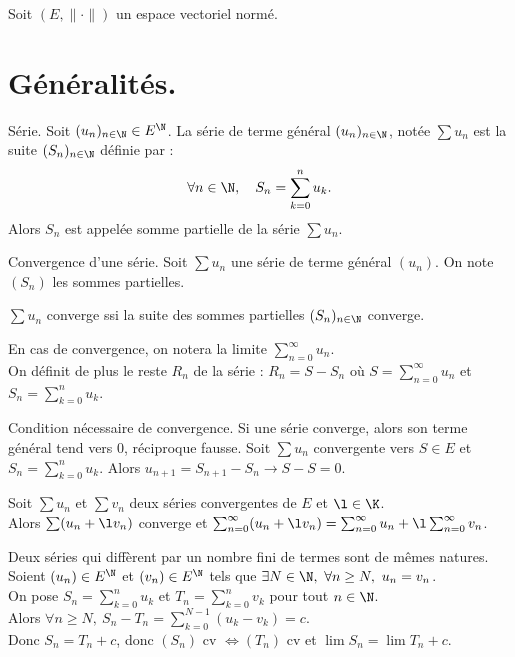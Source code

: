 \documentclass[11pt]{article}
\begin{document}


\thispagestyle{fancy}

Soit $(E,\|\cdot\|)$ un espace vectoriel normé.

\section{Généralités.}

\begin{defi}{Série.}{}
    Soit $(u_n)_{n\in\N}\in E^\N$. La série de terme général $(u_n)_{n\in\N}$, notée $\sum u_n$ est la suite $(S_n)_{n\in\N}$ définie par :
    \begin{equation*}
        \forall n \in \N, \quad S_n = \sum_{k=0}^n u_k.
    \end{equation*}
    Alors $S_n$ est appelée somme partielle de la série $\sum u_n$.
\end{defi}

\begin{defi}{Convergence d'une série.}{}
    Soit $\sum u_n$ une série de terme général $(u_n)$. On note $(S_n)$ les sommes partielles.
    \begin{center}
        $\sum u_n$ converge ssi la suite des sommes partielles $(S_n)_{n\in\N}$ converge.
    \end{center}
    En cas de convergence, on notera la limite $\sum_{n=0}^{\infty}u_n$.\\
    On définit de plus le reste $R_n$ de la série : $R_n=S-S_n$ où $S=\sum_{n=0}^\infty u_n$ et $S_n=\sum_{k=0}^nu_k$.
\end{defi}

\begin{prop}{Condition nécessaire de convergence.}{}
    Si une série converge, alors son terme général tend vers 0, réciproque fausse.
    \tcblower
    Soit $\sum u_n$ convergente vers $S\in E$ et $S_n=\sum_{k=0}^nu_k$. Alors $u_{n+1}=S_{n+1}-S_n\to S-S = 0$.
\end{prop}

\begin{prop}{}{}
    Soit $\sum u_n$ et $\sum v_n$ deux séries convergentes de $E$ et $\l\in\K$.\\
    Alors $\sum(u_n +\l v_n)$ converge et $\sum_{n=0}^\infty(u_n+\l v_n) = \sum_{n=0}^\infty u_n + \l\sum_{n=0}^\infty v_n$.
\end{prop}

\vspace*{-0.7cm}

\begin{prop}{}{}
    Deux séries qui diffèrent par un nombre fini de termes sont de mêmes natures.
    \tcblower
    Soient $(u_n)\in E^\N$ et $(v_n)\in E^\N$ tels que $\exists N \in \N, ~ \forall n \geq N, ~ u_n = v_n$.\\
    On pose $S_n =\sum_{k=0}^nu_k$ et $T_n =\sum_{k=0}^n v_k$ pour tout $n\in\N$.\\
    Alors $\forall n \geq N, ~ S_n - T_n = \sum_{k=0}^{N-1}(u_k-v_k)=c$.\\
    Donc $S_n=T_n+c$, donc $(S_n)$ cv $\iff (T_n)$ cv et $\lim S_n = \lim T_n + c$.
\end{prop}
\end{document}
